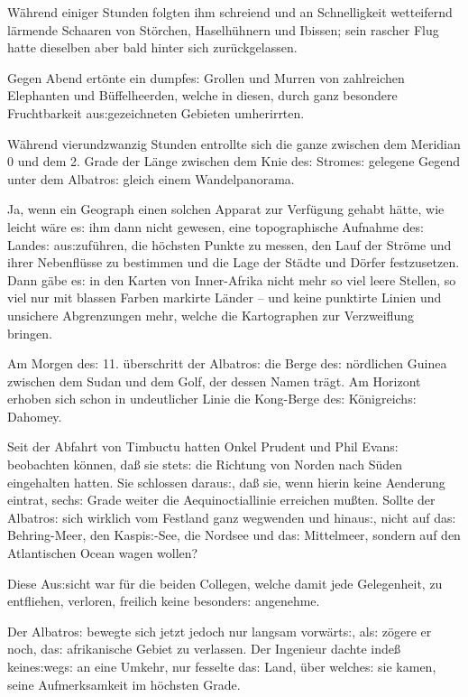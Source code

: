 \documentclass[oneside,12pt]{book}
\newcommand{\s}{s:}
\begin{document}
W\"ahrend einiger Stunden folgten ihm schreiend und an Schnelligkeit
wetteifernd l\"armende Schaaren von St\"orchen, Haselh\"uhnern und
Ibissen; sein rascher Flug hatte dieselben aber bald hinter sich
zur\"uckgelassen.

Gegen Abend ert\"onte ein dumpfe{\s} Grollen und Murren von
zahlreichen Elephanten und B\"uf\-fel\-heerden, welche in diesen, durch
ganz besondere Fruchtbarkeit au{\s}gezeichneten Gebieten umherirrten.

W\"ahrend vierundzwanzig Stunden entrollte sich die ganze zwischen
dem Meridian 0 und dem 2. Grade der L\"ange zwischen dem Knie de{\s}
Strome{\s} gelegene Gegend unter dem {\glqq}Albatro{\s}{\grqq} gleich
einem Wandelpanorama.

Ja, wenn ein Geograph einen solchen Apparat zur Verf\"ugung gehabt
h\"atte, wie leicht w\"are e{\s} ihm dann nicht gewesen, eine
topographische Aufnahme de{\s} Lande{\s} au{\s}zuf\"uhren, die
h\"ochsten Punkte zu messen, den Lauf der Str\"ome und ihrer
Nebenfl\"usse zu bestimmen und die Lage der St\"adte und D\"orfer
fest\/zusetzen. Dann g\"abe e{\s} in den Karten von Inner-Afrika nicht
mehr so viel leere Stellen, so viel nur mit blassen Farben markirte
L\"ander -- und keine punktirte Linien und unsichere Abgrenzungen
mehr, welche die Kartographen zur Verzweiflung bringen.

Am Morgen de{\s} 11. \"uberschritt der {\glqq}Albatro{\s}{\grqq} die
Berge de{\s} n\"ordlichen Guinea zwischen dem Sudan und dem Golf, der
dessen Namen tr\"agt. Am Horizont erhoben sich schon in undeutlicher
Linie die Kong-Berge de{\s} K\"onigreich{\s} Dahomey.

Seit der Abfahrt von Timbuctu hatten Onkel Prudent und Phil Evan{\s}
beobachten k\"onnen, da{\ss} sie stet{\s} die Richtung von Norden
nach S\"uden eingehalten hatten. Sie schlossen darau{\s}, da{\ss}
sie, wenn hierin keine Aenderung eintrat, sech{\s} Grade weiter die
Aequinoctiallinie erreichen mu{\ss}ten. Sollte der
{\glqq}Albatro{\s}{\grqq} sich wirklich vom Festland ganz wegwenden
und hinau{\s}, nicht auf da{\s} Behring-Meer, den Kaspi{\s}-See, die
Nordsee und da{\s} Mittelmeer, sondern auf den Atlantischen Ocean
wagen wollen?

Diese Au{\s}sicht war f\"ur die beiden Collegen, welche damit jede
Gelegenheit, zu entfliehen, verloren, freilich keine besonder{\s}
angenehme.

Der {\glqq}Albatro{\s}{\grqq} bewegte sich jetzt jedoch nur langsam
vorw\"art{\s}, al{\s} z\"ogere er noch, da{\s} afrikanische Gebiet zu
verlassen. Der Ingenieur dachte inde{\ss} keine{\s}weg{\s} an eine
Umkehr, nur fesselte da{\s} Land, \"uber welche{\s} sie kamen, seine
Aufmerksamkeit im h\"ochsten Grade.
\end{document}
